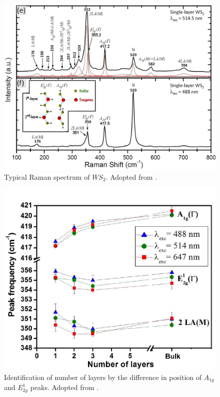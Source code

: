 \begin{figure}[h]
	\begin{center}
		\includegraphics[scale=0.3]{RamanPeaksIdentification.png}
		\caption{Typical Raman spectrum of $WS_2$. Adopted from \cite{Berkdemir2013}.}
		\label{fig:TypicalRamanSpectrumWS2}
	\end{center}
\end{figure}
	
\begin{figure}
	\begin{center}
		\includegraphics[scale=0.3]{NumberLayerIdentificationRaman.png}
		\caption{Identification of number of layers by the difference in position of $A_{1g}$ and $E^1_{2g}$ peaks. Adopted from \cite{Berkdemir2013}.}
		\label{fig:LayerNumberIdentificationRamanShiftWS2}
	\end{center}
\end{figure}

